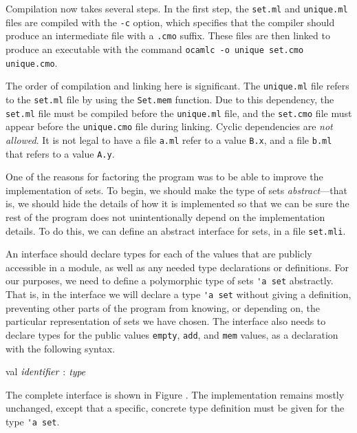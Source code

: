  Compilation now takes several steps. In the first step, the
\hbox{\lstinline/set.ml/} and \hbox{\lstinline/unique.ml/} files are compiled with the
\hbox{\lstinline/-c/} option, which specifies that the compiler should produce an intermediate file
with a \hbox{\lstinline/.cmo/} suffix. These files are then linked to produce an executable with the
command \hbox{\lstinline/ocamlc -o unique set.cmo unique.cmo/}.

The order of compilation and linking here is
significant. The \hbox{\lstinline/unique.ml/} file refers to
the \hbox{\lstinline/set.ml/} file by using
the \hbox{\lstinline/Set.mem/} function. Due to this dependency,
the \hbox{\lstinline/set.ml/} file must be compiled before
the \hbox{\lstinline/unique.ml/} file, and
the \hbox{\lstinline/set.cmo/} file must appear before
the \hbox{\lstinline/unique.cmo/} file during linking. 
Cyclic dependencies are \emph{not allowed}. It is not legal to have a
file \hbox{\lstinline/a.ml/} refer to a value \hbox{\lstinline/B.x/},
and a file \hbox{\lstinline/b.ml/} that refers to a
value \hbox{\lstinline/A.y/}.


One of the reasons for factoring the program was to be able to improve
the implementation of sets. To begin, we should make the type of
sets \emph{abstract}---that is, we should hide the details of how it
is implemented so that we can be sure the rest of the program does not
unintentionally depend on the implementation details. To do this, we
can define an abstract interface for sets, in a
file \hbox{\lstinline/set.mli/}.

An interface should declare types for each of the values that are
publicly accessible in a module, as well as any needed type
declarations or definitions. For our purposes, we need to define a
polymorphic type of sets \hbox{\lstinline/'a set/} abstractly. That
is, in the interface we will declare a type \hbox{\lstinline/'a set/}
without giving a definition, preventing other parts of the program
from knowing, or depending on, the particular representation of sets
we have chosen. The interface also needs to declare types for the
public values \hbox{\lstinline/empty/}, \hbox{\lstinline/add/},
and \hbox{\lstinline/mem/} values, as a declaration with the following
syntax.

\label{keyword:val(signatures)}
\begin{ocaml}
val $\textit{\rmfamily identifier}$ : $\textit{\rmfamily type}$
\end{ocaml}
%
The complete interface is shown in Figure . The
implementation remains mostly unchanged, except that a specific,
concrete type definition must be given for the type
%
\hbox{\lstinline/'a set/}.

